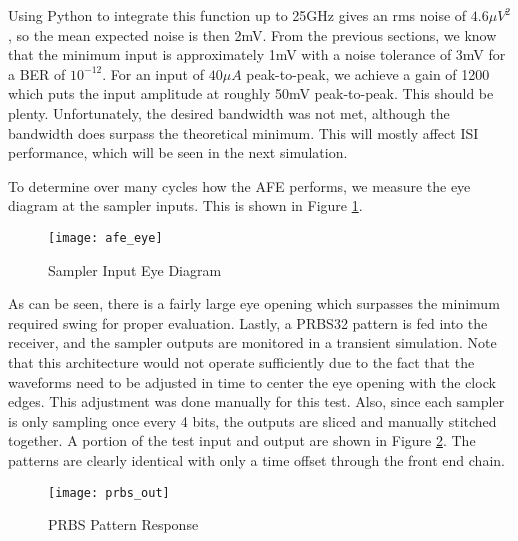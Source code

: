 Using Python to integrate this function up to 25GHz gives an rms noise of $4.6\mu V^2$, so the mean expected noise is then 2mV.
\clearpage
From the previous sections, we know that the minimum input is approximately 1mV with a noise tolerance of 3mV for a BER of $10^{-12}$. For an input of $40\mu A$ peak-to-peak, we achieve a gain of 1200 which puts the input amplitude at roughly 50mV peak-to-peak. This should be plenty. Unfortunately, the desired bandwidth was not met, although the bandwidth does surpass the theoretical minimum. This will mostly affect ISI performance, which will be seen in the next simulation.

To determine over many cycles how the AFE performs, we measure the eye diagram at the sampler inputs. This is shown in Figure \ref{fig:eye}.
\begin{figure}[h]
\centering
\texttt{[image: afe\_eye]}
\caption{Sampler Input Eye Diagram}
\label{fig:eye}
\end{figure}
As can be seen, there is a fairly large eye opening which surpasses the minimum required swing for proper evaluation.
\clearpage
Lastly, a PRBS32 pattern is fed into the receiver, and the sampler outputs are monitored in a transient simulation. Note that this architecture would not operate sufficiently due to the fact that the waveforms need to be adjusted in time to center the eye opening with the clock edges. This adjustment was done manually for this test. Also, since each sampler is only sampling once every 4 bits, the outputs are sliced and manually stitched together. A portion of the test input and output are shown in Figure \ref{fig:prbs}. The patterns are clearly identical with only a time offset through the front end chain.
\begin{figure}[h]
\centering
\texttt{[image: prbs\_out]}
\caption{PRBS Pattern Response}
\label{fig:prbs}
\end{figure}

